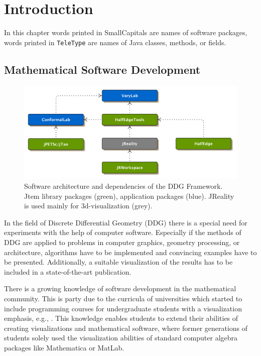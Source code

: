 \documentclass[Thesis.tex]{subfiles}
\begin{document}
\chapter{Introduction}

In this chapter words printed in {\sc SmallCapitals} are names of software packages, words printed
in {\tt TeleType} are names of {\sc Java} classes, methods, or fields.

\section{Mathematical Software Development}

\begin{figure}[h]
	\centering
	\includegraphics[width=\linewidth]{figures/software_architecture}
	\caption[Software package dependencies]{
		Software architecture and dependencies of the DDG Framework. 
		{\sc Jtem} library packages (green), application packages (blue). {\sc JReality} is used mainly for 3d-visualization (grey).}
	\label{fig:software_architecture}
\end{figure}

In the field of Discrete Differential Geometry (DDG) there is a special need for experiments
with the help of computer software. Especially if the methods of DDG are applied
to problems in computer graphics, geometry processing, or architecture, algorithms have 
to be implemented and convincing examples have to be presented. Additionally, a suitable 
visualization of the results has to be included in a state-of-the-art publication.

There is a growing knowledge of software development in the mathematical community. This 
is party due to the curricula of universities which started to include programming courses for 
undergraduate students with a visualization emphasis, e.g., \cite{VisMathHomepage, 
CaltechVisMath}. This knowledge enables students to extend their abilities of creating visualizations and 
mathematical software, where former generations of students solely used the visualization 
abilities of standard computer algebra packages like Mathematica or MatLab.
\end{document}
